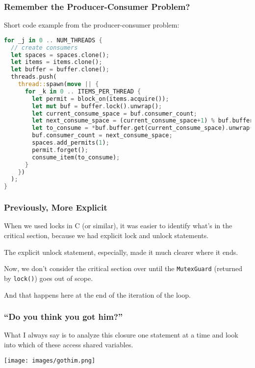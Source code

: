 \begin{frame}[fragile]
\frametitle{Remember the Producer-Consumer Problem?}

Short code example from the producer-consumer problem:
\begin{lstlisting}[language=Rust]
for _j in 0 .. NUM_THREADS {
  // create consumers
  let spaces = spaces.clone();
  let items = items.clone();
  let buffer = buffer.clone();
  threads.push(
    thread::spawn(move || {
      for _k in 0 .. ITEMS_PER_THREAD {
        let permit = block_on(items.acquire());
        let mut buf = buffer.lock().unwrap();
        let current_consume_space = buf.consumer_count;
        let next_consume_space = (current_consume_space+1) % buf.buffer.len();
        let to_consume = *buf.buffer.get(current_consume_space).unwrap();
        buf.consumer_count = next_consume_space;
        spaces.add_permits(1);
        permit.forget();
        consume_item(to_consume);
      }
    })
  );
}

\end{lstlisting}

\end{frame}


\begin{frame}
\frametitle{Previously, More Explicit}

When we used locks in C (or similar), it was easier to identify what's in the critical section, because we had explicit lock and unlock statements. 

The explicit unlock statement, especially, made it much clearer where it ends. 

Now, we don't consider the critical section over until the \texttt{MutexGuard} (returned by \texttt{lock()}) goes out of scope. 

And that happens here at the end of the iteration of the loop.



\end{frame}




\begin{frame}
\frametitle{``Do you think you got him?''}

What I always say is to analyze this closure one statement at a time and look into which of these access shared variables. 

\begin{center}
	\texttt{[image: images/gothim.png]}
\end{center}

\end{frame}


